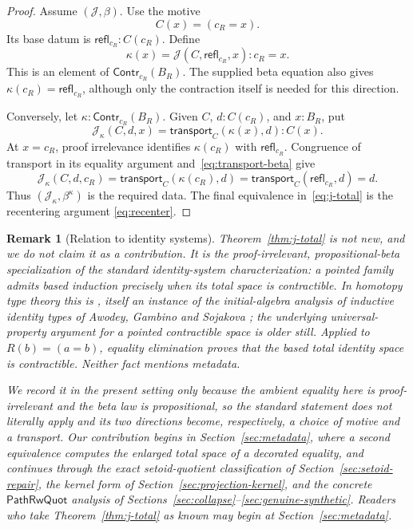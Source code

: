 \documentclass[10pt,reqno]{amsart}
\newtheorem{remark}[theorem]{Remark}
\newcommand{\Contr}{\mathsf{Contr}}
\newcommand{\refl}{\mathsf{refl}}
\newcommand{\transport}{\mathsf{transport}}
\newcommand{\PRW}{\mathsf{PathRwQuot}}
\begin{document}
\begin{proof}
Assume \((\mathcal J,\beta)\).  Use the motive
\[
                         C(x)=(c_R=x).
\tag{3.2}\label{eq:contraction-motive}
\]
Its base datum is \(\refl_{c_R}:C(c_R)\).  Define
\[
       \kappa(x)=\mathcal J(C,\refl_{c_R},x):c_R=x.
\tag{3.3}\label{eq:kappa-from-j}
\]
This is an element of \(\Contr_{c_R}(B_R)\).  The supplied beta equation
also gives \(\kappa(c_R)=\refl_{c_R}\), although only the contraction itself
is needed for this direction.

Conversely, let \(\kappa:\Contr_{c_R}(B_R)\).  Given \(C\), \(d:C(c_R)\),
and \(x:B_R\), put
\[
        \mathcal J_\kappa(C,d,x)
        =\transport_C(\kappa(x),d):C(x).
\tag{3.4}\label{eq:j-from-kappa}
\]
At \(x=c_R\), proof irrelevance identifies
\(\kappa(c_R)\) with \(\refl_{c_R}\).  Congruence of transport in its equality
argument and~\eqref{eq:transport-beta} give
\[
 \mathcal J_\kappa(C,d,c_R)
 =\transport_C(\kappa(c_R),d)
 =\transport_C(\refl_{c_R},d)
 =d.
\tag{3.5}\label{eq:derived-beta}
\]
Thus \((\mathcal J_\kappa,\beta^\kappa)\) is the required data.
The final equivalence in~\eqref{eq:j-total} is the recentering argument
\eqref{eq:recenter}.
\end{proof}

\begin{remark}[Relation to identity systems]
\label{rem:standard-stage}
Theorem~\ref{thm:j-total} is not new, and we do not claim it as a contribution.
It is the proof-irrelevant, propositional-beta specialization of the standard
\emph{identity-system} characterization: a pointed family admits based induction
precisely when its total space is contractible.  In homotopy type theory this is
\cite[Thm.~5.8.2]{HoTTBook2013}, itself an instance of the initial-algebra
analysis of inductive identity types of Awodey, Gambino and Sojakova
\cite{AwodeyGambinoSojakova2012,AwodeyGambinoSojakova2017}; the underlying
universal-property argument for a pointed contractible space is older still.
Applied to \(R(b)=(a=b)\), equality elimination proves that
the based total identity space is contractible.  Neither fact mentions
metadata.

We record it in the present setting only because the ambient equality here is
proof-irrelevant and the beta law is propositional, so the standard statement
does not literally apply and its two directions become, respectively, a choice of
motive and a transport.  Our contribution begins in
Section~\ref{sec:metadata}, where a second equivalence \emph{computes} the
enlarged total space of a decorated equality, and continues through the exact
setoid-quotient classification of Section~\ref{sec:setoid-repair}, the
kernel form of Section~\ref{sec:projection-kernel}, and the concrete
\(\PRW\) analysis of Sections~\ref{sec:collapse}--\ref{sec:genuine-synthetic}.
Readers who take Theorem~\ref{thm:j-total} as known may begin at
Section~\ref{sec:metadata}.
\end{remark}
\end{document}
